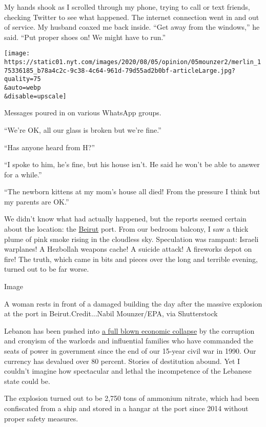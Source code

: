 My hands shook as I scrolled through my phone, trying to call or text
friends, checking Twitter to see what happened. The internet connection
went in and out of service. My husband coaxed me back inside. ``Get away
from the windows,'' he said. ``Put proper shoes on! We might have to
run.''

\texttt{[image: https://static01.nyt.com/images/2020/08/05/opinion/05mounzer2/merlin\_175336185\_b78a4c2c-9c38-4c64-961d-79d55ad2b0bf-articleLarge.jpg?quality=75\\\&auto=webp\\\&disable=upscale]}

Messages poured in on various WhatsApp groups.

``We're OK, all our glass is broken but we're fine.''

``Has anyone heard from H?''

``I spoke to him, he's fine, but his house isn't. He said he won't be
able to answer for a while.''

``The newborn kittens at my mom's house all died! From the pressure I
think but my parents are OK.''

We didn't know what had actually happened, but the reports seemed
certain about the location: the
\href{https://www.nytimes.com/2020/08/07/world/middleeast/lebanon-explosion-ship.html}{Beirut}
port. From our bedroom balcony, I saw a thick plume of pink smoke rising
in the cloudless sky. Speculation was rampant: Israeli warplanes! A
Hezbollah weapons cache! A suicide attack! A fireworks depot on fire!
The truth, which came in bits and pieces over the long and terrible
evening, turned out to be far worse.

Image

A woman rests in front of a damaged building the day after the massive
explosion at the port in Beirut.Credit...Nabil Mounzer/EPA, via
Shutterstock

Lebanon has been pushed into
\href{https://www.nytimes.com/2020/08/03/opinion/lebanon-coronavirus-economy.html}{a
full blown economic collapse} by the corruption and cronyism of the
warlords and influential families who have commanded the seats of power
in government since the end of our 15-year civil war in 1990. Our
currency has devalued over 80 percent. Stories of destitution abound.
Yet I couldn't imagine how spectacular and lethal the incompetence of
the Lebanese state could be.

The explosion turned out to be 2,750 tons of ammonium nitrate, which had
been confiscated from a ship and stored in a hangar at the port since
2014 without proper safety measures.

